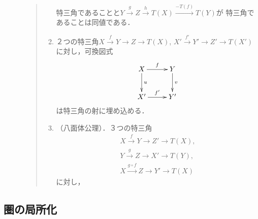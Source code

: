 \begin{Definition}
\begin{description}
\begin{quote}
\begin{enumerate}
                    特三角であることと$Y\overset{g}{\longrightarrow}
                    Z\overset{h}{\longrightarrow} T(X)\overset{-T(f)}{\longrightarrow} T(Y)$が
                    特三角であることは同値である．\label{TR3}
                \item ２つの特三角$X\overset{f}{\to}
                Y\to Z\to T(X)$, $X'\overset{f'}{\to}
                Y'\to Z'\to T(X')$に対し，可換図式
                \begin{equation*}
                    \vcenter{\xymatrix
                    @C=26pt@R=26pt
                    {
                    X\ar[r]^-{f}\ar[d]^-{u}
                    &
                    Y\ar[d]^-{v} 
                    \\
                    X'\ar[r]^-{f'}
                    &
                    Y'
                    }}
                \end{equation*}
                は特三角の射に埋め込める．\label{TR4}
                \item（八面体公理）．３つの特三角
                \begin{align*}
                    X\overset{f}{\to}Y\to Z'\to T(X), \\
                    Y\overset{g}{\to}Z\to X'\to T(Y),\\
                    X\overset{g\circ f}{\longrightarrow}
                    Z\to Y'\to T(X)
                \end{align*}
                に対し， \label{TR5}
            \end{enumerate}    
        \end{quote}
    \end{description}
\end{Definition}

\subsection{圏の局所化}












